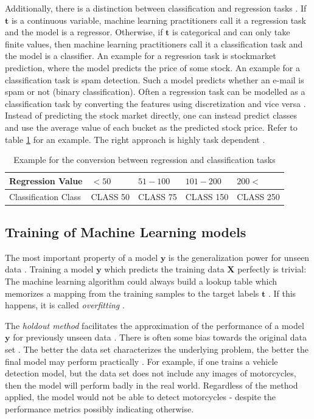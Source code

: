 \documentclass[draft,final,oneside]{vutinfth} %
\begin{document}
Additionally, there is a distinction between classification and regression tasks \cite{bishop}. If $\boldsymbol{t}$ is a continuous variable, machine learning practitioners call it a regression task and the model is a regressor. Otherwise, if $\boldsymbol{t}$ is categorical and can only take finite  values, then machine learning practitioners call it a classification task and the model is a classifier. An example for a regression task is stockmarket prediction, where the model predicts the price of some stock. An example for a classification task is spam detection. Such a model predicts whether an e-mail is spam or not (binary classification). Often a regression task can be modelled as a classification task by converting the features using discretization and vice versa \cite{discretization}. Instead of predicting the stock market directly, one can instead predict classes and use the average value of each bucket as the predicted stock price. Refer to table \ref{table:conversionregressclass} for an example. The right approach is highly task dependent \cite{aimodern}.

\begin{table}[]
\centering
\begin{tabular}{|l||l|l|l|l|}
\hline
Regression Value & $<50$ & $51 - 100$ & $101 - 200$ & $200<$ \\
\hline
Classification Class & CLASS 50      & CLASS 75 & CLASS 150 & CLASS 250 \\
\hline
\end{tabular}
\caption{Example for the conversion between regression and classification tasks }
\label{table:conversionregressclass}
\end{table}

\subsection{Training of Machine Learning models} \label{trainingofml}

The most important property of a model $\boldsymbol{y}$ is the generalization power for unseen data \cite{bishop}. Training a model $\boldsymbol{y}$ which predicts the training data $\boldsymbol{X}$ perfectly is trivial: The machine learning algorithm could always build a lookup table which memorizes a mapping from the training samples to the target labels $\boldsymbol{t}$ \cite{overfitting}. If this happens, it is called \textit{overfitting} \cite{overfitting}.

The \textit{holdout method} facilitates the approximation of the performance of a model $\boldsymbol{y}$ for previously unseen data \cite{holdoutcrossvalidation}. There is often some bias towards the original data set \cite{datasetbias}. The better the data set characterizes the underlying problem, the better the final model may perform practically \cite{datasetshift}. For example, if one trains a vehicle detection model, but the data set does not include any images of motorcycles, then the model will perform badly in the real world. Regardless of the method applied, the model would not be able to detect motorcycles - despite the performance metrics possibly indicating otherwise.
\end{document}
